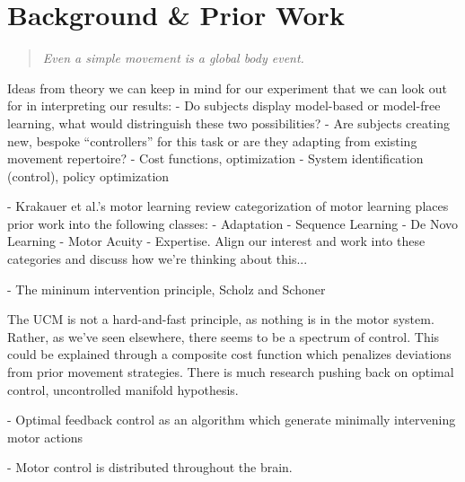 \documentclass[../main.tex]{subfiles}
\begin{document}
\chapter{Background \& Prior Work}\label{chap:bg_theory}

\begin{quote}
  \emph{Even a simple movement is a global body event.}\\
\end{quote}  





Ideas from theory we can keep in mind for our experiment that we can look out for in interpreting our results:
- Do subjects display model-based or model-free learning, what would distringuish these two possibilities?
- Are subjects creating new, bespoke ``controllers'' for this task or are they adapting from existing movement repertoire?
- Cost functions, optimization
- System identification (control), policy optimization


- Krakauer et al.'s motor learning review categorization of motor learning places prior work into the following classes: - Adaptation - Sequence Learning - De Novo Learning - Motor Acuity - Expertise. Align our interest and work into these categories and discuss how we're thinking about this...

- The mininum intervention principle, Scholz and Schoner

The UCM is not a hard-and-fast principle, as nothing is in the motor system. Rather, as we've seen elsewhere, there seems to be a spectrum of control. This could be explained through a composite cost function which penalizes deviations from prior movement strategies\cite{raczSpatiotemporalAnalysisReveals2013}. There is much research pushing back on optimal control, uncontrolled manifold hypothesis. 


- Optimal feedback control as an algorithm which generate minimally intervening motor actions

- Motor control is distributed throughout the brain\cite{sejnowskiPerspectivesCognitiveNeuroscience1988}.
\end{document}
